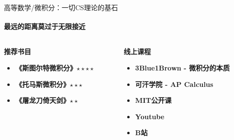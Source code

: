\documentclass{beamer}
\begin{document}
\begin{frame}{高等数学/微积分：一切CS理论的基石}

    \framesubtitle{最远的距离莫过于无限接近}
    
    \begin{columns}[T]
        \begin{column}{0.5\textwidth}
            \Large\textbf{推荐书目}
                \begin{itemize}
                    \item \textbf{《斯图尔特微积分》$\star \star \star \star$}
                    \item \textbf{《托马斯微积分》$\star \star \star$}
                    \item \textbf{《屠龙刀倚天剑》$\star \star$}
                \end{itemize}

        \end{column}
        
        \begin{column}{0.5\textwidth}
            \Large\textbf{线上课程}
            \begin{itemize}
                \item \textbf{3Blue1Brown - 微积分的本质}

                \item \textbf{可汗学院 - AP Calculus}

                \item \textbf{MIT公开课}

                \item \textbf{Youtube}
                
                \item \textbf{B站}
            \end{itemize}
        \end{column}
    \end{columns}
\end{frame}
\end{document}
